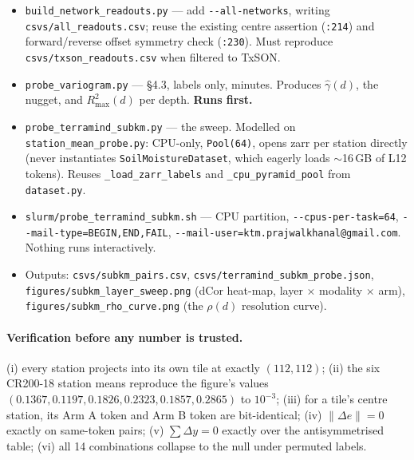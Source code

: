 \documentclass[11pt,a4paper]{article}
\begin{document}
\begin{itemize}[nosep]
  \item \verb|build_network_readouts.py| --- add \verb|--all-networks|, writing
        \verb|csvs/all_readouts.csv|; reuse the existing centre assertion (\verb|:214|) and
        forward/reverse offset symmetry check (\verb|:230|). Must reproduce
        \verb|csvs/txson_readouts.csv| when filtered to TxSON.
  \item \verb|probe_variogram.py| --- \S4.3, labels only, minutes. Produces $\hat\gamma(d)$,
        the nugget, and $R^2_{\max}(d)$ per depth. \textbf{Runs first.}
  \item \verb|probe_terramind_subkm.py| --- the sweep. Modelled on
        \verb|station_mean_probe.py|: CPU-only, \verb|Pool(64)|, opens zarr per station
        directly (never instantiates \verb|SoilMoistureDataset|, which eagerly loads
        $\sim$16\,GB of L12 tokens). Reuses \verb|_load_zarr_labels| and
        \verb|_cpu_pyramid_pool| from \verb|dataset.py|.
  \item \verb|slurm/probe_terramind_subkm.sh| --- CPU partition,
        \verb|--cpus-per-task=64|, \verb|--mail-type=BEGIN,END,FAIL|,
        \verb|--mail-user=ktm.prajwalkhanal@gmail.com|. Nothing runs interactively.
  \item Outputs: \verb|csvs/subkm_pairs.csv|, \verb|csvs/terramind_subkm_probe.json|,
        \verb|figures/subkm_layer_sweep.png| (dCor heat-map, layer $\times$ modality
        $\times$ arm), \verb|figures/subkm_rho_curve.png| (the $\rho(d)$ resolution curve).
\end{itemize}

\paragraph{Verification before any number is trusted.}
(i) every station projects into its own tile at exactly $(112,112)$;
(ii) the six CR200-18 station means reproduce the figure's values
$(0.1367, 0.1197, 0.1826, 0.2323, 0.1857, 0.2865)$ to $10^{-3}$;
(iii) for a tile's centre station, its Arm A token and Arm B token are bit-identical;
(iv) $\lVert\Delta e\rVert = 0$ exactly on same-token pairs;
(v) $\sum \Delta y = 0$ exactly over the antisymmetrised table;
(vi) all 14 combinations collapse to the null under permuted labels.
\end{document}
